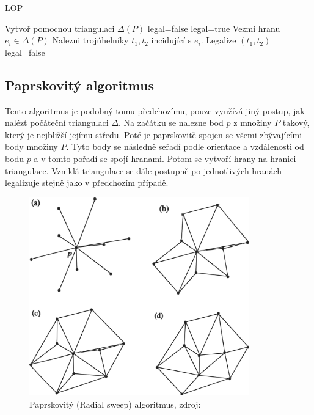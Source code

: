 \documentclass[12pt,a4paper]{article}
\begin{document}
{%
\begin{algorithm}
\caption{LOP}
\begin{algorithmic}[1]
\State Vytvoř pomocnou triangulaci $\Delta(P)$
\State legal=false
	\State legal=true
		\State Vezmi hranu $e_i \in \Delta(P)$
		\State Nalezni trojúhelníky $t_1,t_2$ incidující s $e_i$.
			\State Legalize $(t_1,t_2)$
			\State legal=false
		\EndIf
	\EndFor
\EndWhile	
\end{algorithmic}
\end{algorithm}

\newpage
\subsection{Paprskovitý algoritmus}

Tento algoritmus je podobný tomu předchozímu, pouze využívá jiný
postup, jak nalézt počáteční triangulaci $\Delta$. Na začátku se
nalezne bod $p$ z množiny $P$ takový, který je nejbližší jejímu
středu. Poté je paprskovitě spojen se všemi zbývajícími body množiny
$P$. Tyto body se následně seřadí podle orientace a vzdálenosti od
bodu $p$ a v tomto pořadí se spojí hranami. Potom se vytvoří hrany na
hranici triangulace. Vzniklá triangulace se dále postupně po
jednotlivých hranách legalizuje stejně jako v předchozím případě.

\begin{figure}[h!]
\centering
\includegraphics[width=0.85\textwidth]{img/rsweep.png}
\caption{Paprskovitý (Radial sweep) algoritmus, zdroj: \cite{triangulation}}
\label{fig:rsweep}
\end{figure}

}
\end{document}
